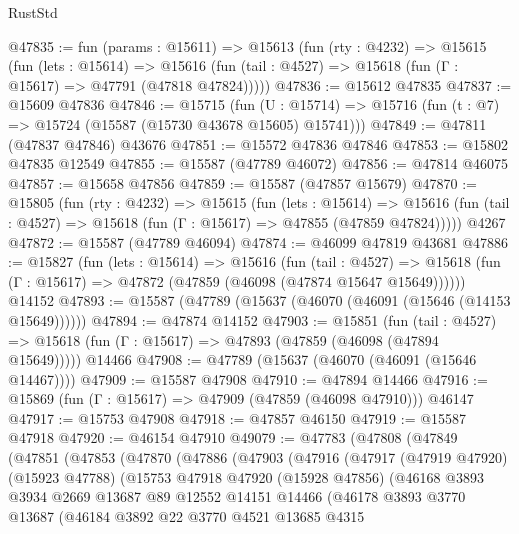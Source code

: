 \begin{lexlean}{RustStd}
\begin{coremodule}
@47835 := fun (params : @15611) =>
  @15613
    (fun (rty : @4232) =>
    @15615
      (fun (lets : @15614) =>
      @15616 (fun (tail : @4527) => @15618 (fun (Γ : @15617) => @47791 (@47818 @47824)))))
@47836 := @15612 @47835
@47837 := @15609 @47836
@47846 := @15715
    (fun (U : @15714) => @15716 (fun (t : @7) => @15724 (@15587 (@15730 @43678 @15605) @15741)))
@47849 := @47811 (@47837 @47846) @43676
@47851 := @15572 @47836 @47846
@47853 := @15802 @47835 @12549
@47855 := @15587 (@47789 @46072)
@47856 := @47814 @46075
@47857 := @15658 @47856
@47859 := @15587 (@47857 @15679)
@47870 := @15805
    (fun (rty : @4232) =>
    @15615
      (fun (lets : @15614) =>
      @15616 (fun (tail : @4527) => @15618 (fun (Γ : @15617) => @47855 (@47859 @47824)))))
    @4267
@47872 := @15587 (@47789 @46094)
@47874 := @46099 @47819 @43681
@47886 := @15827
    (fun (lets : @15614) =>
    @15616
      (fun (tail : @4527) =>
      @15618 (fun (Γ : @15617) => @47872 (@47859 (@46098 (@47874 @15647 @15649))))))
    @14152
@47893 := @15587 (@47789 (@15637 (@46070 (@46091 (@15646 (@14153 @15649))))))
@47894 := @47874 @14152
@47903 := @15851
    (fun (tail : @4527) => @15618 (fun (Γ : @15617) => @47893 (@47859 (@46098 (@47894 @15649)))))
    @14466
@47908 := @47789 (@15637 (@46070 (@46091 (@15646 @14467))))
@47909 := @15587 @47908
@47910 := @47894 @14466
@47916 := @15869 (fun (Γ : @15617) => @47909 (@47859 (@46098 @47910))) @46147
@47917 := @15753 @47908
@47918 := @47857 @46150
@47919 := @15587 @47918
@47920 := @46154 @47910
@49079 := @47783
    (@47808
      (@47849
        (@47851
          (@47853
            (@47870
              (@47886
                (@47903
                  (@47916
                    (@47917
                      (@47919 @47920)
                      (@15923 @47788)
                      (@15753
                        @47918
                        @47920
                        (@15928 @47856)
                        (@46168
                          @3893
                          @3934
                          @2669
                          @13687
                          @89
                          @12552
                          @14151
                          @14466
                          (@46178
                            @3893
                            @3770
                            @13687
                            (@46184
                              @3892
                              @22
                              @3770
                              @4521
                              @13685
                              @4315

\end{coremodule}
\end{lexlean}
